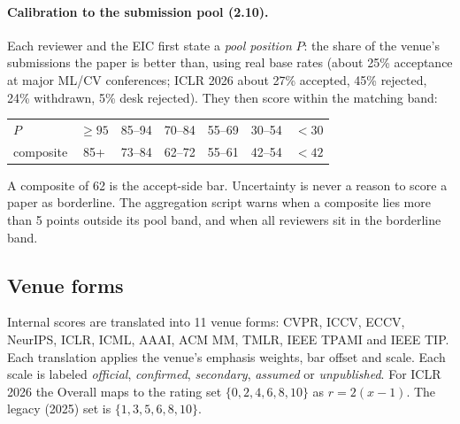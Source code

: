 \documentclass[11pt,a4paper]{article}
\begin{document}
\paragraph{Calibration to the submission pool (2.10).}
Each reviewer and the EIC first state a \emph{pool position} $P$: the share of the venue's
submissions the paper is better than, using real base rates (about 25\% acceptance at major ML/CV
conferences; ICLR 2026 about 27\% accepted, 45\% rejected, 24\% withdrawn, 5\% desk rejected). They
then score within the matching band:
\begin{center}\small
\begin{tabular}{lcccccc}
\toprule
$P$ & $\ge 95$ & 85--94 & 70--84 & 55--69 & 30--54 & $<30$\\
composite & 85+ & 73--84 & 62--72 & 55--61 & 42--54 & $<42$\\
\bottomrule
\end{tabular}
\end{center}
A composite of 62 is the accept-side bar. Uncertainty is never a reason to score a paper as
borderline. The aggregation script warns when a composite lies more than 5 points outside its
pool band, and when all reviewers sit in the borderline band.

\subsection{Venue forms}
Internal scores are translated into 11 venue forms: CVPR, ICCV, ECCV, NeurIPS, ICLR, ICML,
AAAI, ACM MM, TMLR, IEEE TPAMI and IEEE TIP. Each translation applies the venue's emphasis
weights, bar offset and scale. Each scale is labeled \emph{official}, \emph{confirmed},
\emph{secondary}, \emph{assumed} or \emph{unpublished}. For ICLR 2026 the Overall maps to the
rating set $\{0,2,4,6,8,10\}$ as $r = 2(x-1)$. The legacy (2025) set is $\{1,3,5,6,8,10\}$.
\end{document}

